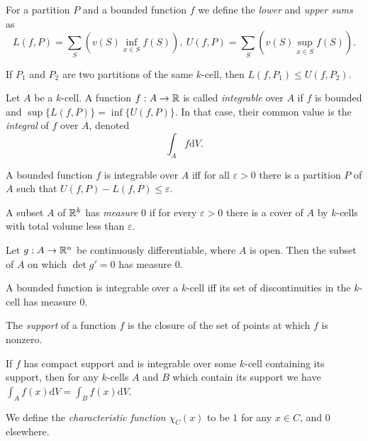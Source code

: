 \begin{defn}
    For a partition $P$ and a bounded function $f$ we define the \emph{lower} and
    \emph{upper sums} as
    \[L(f,P)=\sum_S\left(v(S)\inf_{x\in S}f(S)\right),\
    U(f,P)=\sum_S\left(v(S)\sup_{x\in S}f(S)\right).\]
\end{defn}
\begin{prop}
    If $P_1$ and $P_2$ are two partitions of the same $k$-cell, then
    $L(f,P_1)\le U(f,P_2)$.
\end{prop}
\begin{defn}
    Let $A$ be a $k$-cell. A function $f:A\to\mathbb{R}$ is called \emph{integrable}
    over $A$ if
    $f$ is bounded and $\sup\{L(f,P)\}=\inf\{U(f,P)\}$. In that case, their
    common value is the \emph{integral} of $f$ over $A$, denoted
    \[\int_A f\mathrm dV.\]
\end{defn}
\begin{prop}
    A bounded function $f$ is integrable over $A$ iff for all $\varepsilon>0$ there is a
    partition $P$ of $A$ such that $U(f,P)-L(f,P)\le\varepsilon$.
\end{prop}
\begin{defn}
    A subset $A$ of $\mathbb{R}^k$ has \emph{measure} $0$ if for every $\varepsilon>0$
    there is a cover of $A$ by $k$-cells with total volume less than
    $\varepsilon$.
\end{defn}
\begin{thm}[Sard]
    Let $g:A\to\mathbb{R}^n$ be continuously differentiable, where $A$ is open. Then
    the subset of $A$ on which $\det g'=0$ has measure $0$.
\end{thm}
\begin{thm}
    A bounded function is integrable over a $k$-cell iff its set of
    discontinuities in the $k$-cell has measure $0$.
\end{thm}
\begin{defn}
    The \emph{support} of a function $f$ is the closure of the set of points at
    which $f$ is nonzero.
\end{defn}
\begin{prop}
    If $f$ has compact support and is integrable over some $k$-cell containing
    its support,
    then for any $k$-cells $A$ and $B$ which contain
    its support we have $\int_A f(x)\mathrm dV=\int_B f(x)\mathrm dV$.
\end{prop}
\begin{defn}
    We define the \emph{characteristic function}
    $\chi_C(x)$ to be $1$ for any $x\in C$, and $0$ elsewhere.
\end{defn}
